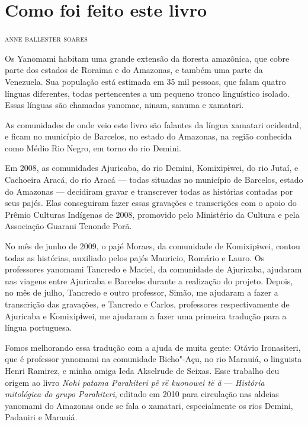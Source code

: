 \chapter{Como foi feito este livro}

\begin{flushright}
\textsc{anne ballester soares}
\end{flushright}

\noindent{}Os Yanomami habitam uma grande extensão da floresta amazônica, que cobre
parte dos estados de Roraima e do Amazonas, e também uma parte da
Venezuela. Sua população está estimada em 35 mil pessoas, que falam
quatro línguas diferentes, todas pertencentes a um pequeno tronco
linguístico isolado. Essas línguas são chamadas yanomae, ninam, sanuma e
xamatari.


As comunidades de onde veio este livro são falantes da língua xamatari
ocidental, e ficam no município de Barcelos, no estado do Amazonas, na
região conhecida como Médio Rio Negro, em torno do rio Demini. 
 

Em 2008, as comunidades Ajuricaba, do rio Demini, Komixipɨwei, do rio
Jutaí, e Cachoeira Aracá, do rio Aracá --- todas situadas no município
de Barcelos, estado do Amazonas --- decidiram gravar e transcrever todas
as histórias contadas por seus pajés. Elas conseguiram fazer essas
gravações e transcrições com o apoio do Prêmio Culturas Indígenas de
2008, promovido pelo Ministério da Cultura e pela Associação Guarani
Tenonde Porã.


No mês de junho de 2009, o pajé Moraes, da comunidade de Komixipɨwei,
contou todas as histórias, auxiliado pelos pajés Mauricio, Romário e
Lauro. Os professores yanomami Tancredo e Maciel, da comunidade de
Ajuricaba, ajudaram nas viagens entre Ajuricaba e Barcelos durante a
realização do projeto. Depois, no mês de julho, Tancredo e outro
professor, Simão, me ajudaram a fazer a transcrição das gravações, e
Tancredo e Carlos, professores respectivamente de Ajuricaba e
Komixipɨwei, me ajudaram a fazer uma primeira tradução para a língua
portuguesa.  

Fomos melhorando essa tradução com a ajuda de muita gente: Otávio
Ironasiteri, que é professor yanomami na comunidade Bicho"-Açu, no rio
Marauiá, o linguista Henri Ramirez, e minha amiga Ieda Akselrude de
Seixas. Esse trabalho deu origem ao livro \emph{Nohi patama Parahiteri
pë rë kuonowei të ã} --- \emph{História mitológica do grupo Parahiteri},
editado em 2010 para circulação nas aldeias yanomami do Amazonas onde se
fala o xamatari, especialmente os rios Demini, Padauiri e Marauiá. 
 

